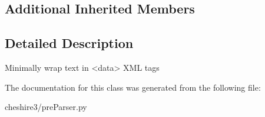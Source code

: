 \subsection*{Additional Inherited Members}


\subsection{Detailed Description}
\begin{DoxyVerb}Minimally wrap text in <data> XML tags\end{DoxyVerb}
 

The documentation for this class was generated from the following file\-:\begin{DoxyCompactItemize}
\item 
cheshire3/pre\-Parser.\-py\end{DoxyCompactItemize}
